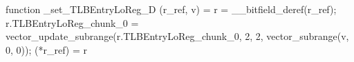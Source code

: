 function _set_TLBEntryLoReg_D (r_ref, v) = {
    r = __bitfield_deref(r_ref);
    r.TLBEntryLoReg_chunk_0 = vector_update_subrange(r.TLBEntryLoReg_chunk_0, 2, 2, vector_subrange(v, 0, 0));
    (*r_ref) = r
}
